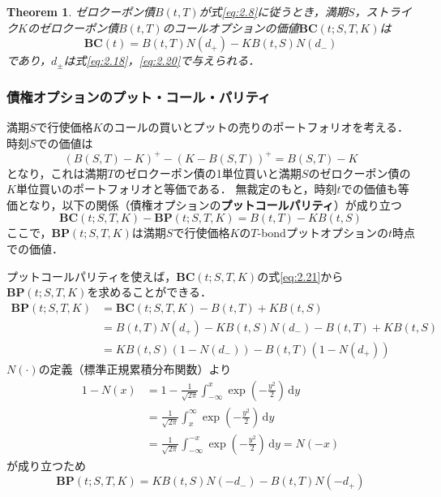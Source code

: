 \documentclass[a4paper, lualatex, ja=standard]{bxjsarticle}
\theoremstyle{theorem}
\newtheorem{thm}{Theorem}[section]
\theoremstyle{definition}
\newcommand{\BC}{\mathbf{BC}}
\newcommand{\BP}{\mathbf{BP}}
\newcommand{\diff}{\mathrm{d}}
\begin{document}
\setcounter{thm}{3}
\begin{thm}
  ゼロクーポン債$B(t,T)$が式\eqref{eq:2.8}に従うとき，満期$S$，ストライク$K$のゼロクーポン債$B(t,T)$のコールオプションの価値$\BC(t;S,T,K)$は
  \begin{equation}
    \BC(t) = B(t,T)N(d_{+}) - KB(t,S)N(d_{-}) \label{eq:2.21}
  \end{equation}
  であり，$d_{\pm}$は式\eqref{eq:2.18}，\eqref{eq:2.20}で与えられる．
\end{thm}

\subsubsection*{債権オプションのプット・コール・パリティ}
満期$S$で行使価格$K$のコールの買いとプットの売りのポートフォリオを考える．
時刻$S$での価値は
\begin{equation*}
  (B(S,T)-K)^+ - (K-B(S,T))^+ = B(S,T) - K
\end{equation*}
となり，これは満期$T$のゼロクーポン債の1単位買いと満期$S$のゼロクーポン債の$K$単位買いのポートフォリオと等価である．
無裁定のもと，時刻$t$での価値も等価となり，以下の関係（債権オプションの\textbf{プットコールパリティ}）が成り立つ
\begin{equation*}
  \BC(t;S,T,K) - \BP(t;S,T,K) = B(t,T) - KB(t,S)
\end{equation*}
ここで，$\BP(t;S,T,K)$は満期$S$で行使価格$K$の$T$-bondプットオプションの$t$時点での価値．

プットコールパリティを使えば，$\BC(t;S,T,K)$の式\eqref{eq:2.21}から$\BP(t;S,T,K)$を求めることができる．
\begin{align*}
  \BP(t;S,T,K) &= \BC(t;S,T,K) - B(t,T) + KB(t,S) \\
  &= B(t,T)N(d_{+}) - KB(t,S)N(d_{-}) - B(t,T) + KB(t,S) \\
  &= KB(t,S)(1-N(d_{-})) - B(t,T)(1-N(d_{+}))
\end{align*}
$N(\cdot)$の定義（標準正規累積分布関数）より
\begin{align*}
  1-N(x) &= 1-\frac{1}{\sqrt{2\pi}}\int_{-\infty}^x \exp\left(-\frac{y^2}{2}\right)\,\diff y\\
  &= \frac{1}{\sqrt{2\pi}}\int_{x}^\infty \exp\left(-\frac{y^2}{2}\right)\,\diff y\\
  &= \frac{1}{\sqrt{2\pi}}\int_{-\infty}^{-x} \exp\left(-\frac{y^2}{2}\right)\,\diff y = N(-x)
\end{align*}
が成り立つため
\begin{equation}
  \BP(t;S,T,K) = KB(t,S)N(-d_{-}) - B(t,T)N(-d_{+}) \label{eq:2.22}
\end{equation}
\end{document}
